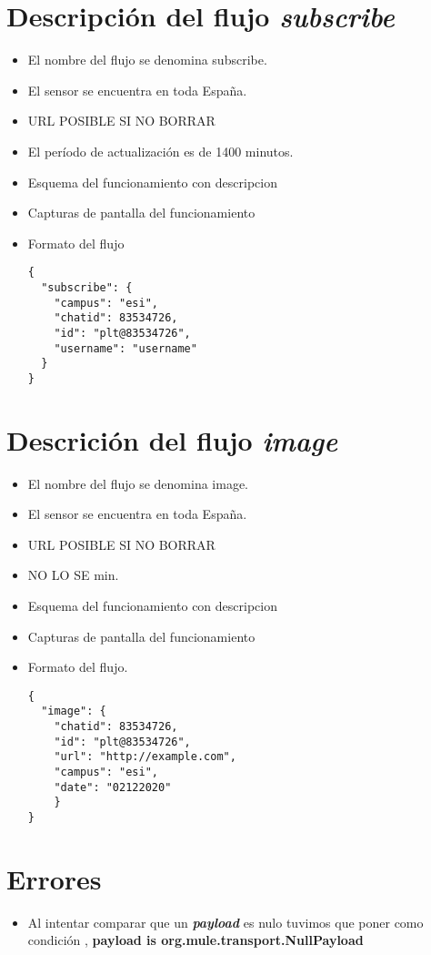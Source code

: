


\section{Descripción del flujo \textit{subscribe}}
\begin{itemize}
	\item El nombre del flujo se denomina subscribe.
	\item El sensor se encuentra en toda España.
	\item URL POSIBLE SI NO BORRAR
	\item El período de actualización es de 1400 minutos.
	\item Esquema del funcionamiento con descripcion
	\item Capturas de pantalla del funcionamiento
	\item Formato del flujo %
    \begin{verbatim}
{
  "subscribe": {
    "campus": "esi",
    "chatid": 83534726,
    "id": "plt@83534726",
    "username": "username"
  }
}
    \end{verbatim}
\end{itemize}
\section{Descrición del flujo \textit{image}}
\begin{itemize}
	\item El nombre del flujo se denomina image.
	\item El sensor se encuentra en toda España.
	\item URL POSIBLE SI NO BORRAR
	\item NO LO SE min.
	\item Esquema del funcionamiento con descripcion
	\item Capturas de pantalla del funcionamiento
	\item Formato del flujo. %
	\begin{verbatim}
{
  "image": {
    "chatid": 83534726,
    "id": "plt@83534726",
    "url": "http://example.com",
    "campus": "esi",
    "date": "02122020"
    }
}
    \end{verbatim}
\end{itemize}

\section{Errores}
\begin{itemize}
	\item  Al intentar comparar que un \textbf{\textit{payload}} 
	      es nulo tuvimos que poner como condición ,
	      \textbf{payload is org.mule.transport.NullPayload}
\end{itemize} 

